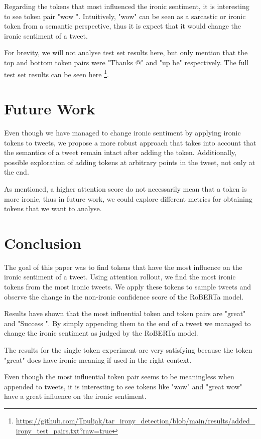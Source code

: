 \documentclass[10pt, a4paper]{article}
\begin{document}
Regarding the tokens that most influenced the ironic sentiment, it is interesting to see token pair "wow \textvisiblespace ".
Intuitively, "wow" can be seen as a sarcastic or ironic token from a semantic perspective, thus it is expect that it would change the ironic sentiment of a tweet.

For brevity, we will not analyse test set results here, but only mention that the top and bottom token pairs were "Thanks @" and "up be" respectively.
The full test set results can be seen here  \footnote{\url{https://github.com/Tpuljak/tar_irony_detection/blob/main/results/added_irony_test_pairs.txt?raw=true}}.

\section{Future Work}

Even though we have managed to change ironic sentiment by applying ironic tokens to tweets, we propose a more robust approach that takes into account that the semantics of a tweet remain intact after adding the token.
Additionally, possible exploration of adding tokens at arbitrary points in the tweet, not only at the end.

As mentioned, a higher attention score do not necessarily mean that a token is more ironic, thus in future work, we could explore different metrics for obtaining tokens that we want to analyse.

\section{Conclusion}

The goal of this paper was to find tokens that have the most influence on the ironic sentiment of a tweet.
Using attention rollout, we find the most ironic tokens from the most ironic tweets.
We apply these tokens to sample tweets and observe the change in the non-ironic confidence score of the RoBERTa model.

Results have shown that the most influential token and token pairs are "great" and "Success \textvisiblespace ".
By simply appending them to the end of a tweet we managed to change the ironic sentiment as judged by the RoBERTa model.

The results for the single token experiment are very satisfying because the token "great" does have ironic meaning if used in the right context.

Even though the most influential token pair seems to be meaningless when appended to tweets, it is interesting to see tokens like "wow" and "great wow" have a great influence on the ironic sentiment.


 
\end{document}
